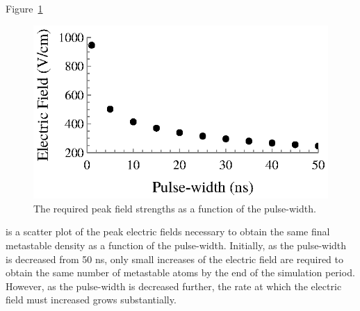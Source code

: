 Figure~\ref{fig:fieldtau}
\begin{figure}
  \centering
  \includegraphics{./chapters/modeling/figures/fieldtau.eps}
  \caption{The required peak field strengths as a function of the pulse-width.}
  \label{fig:fieldtau}
\end{figure}
is a scatter plot of the peak electric fields necessary to obtain the same final
metastable density as a function of the pulse-width. Initially, as the
pulse-width is decreased from 50 ns, only small increases of the electric field
are required to obtain the same number of metastable atoms by the end of the
simulation period. However, as the pulse-width is decreased further, the rate at
which the electric field must increased grows substantially.

